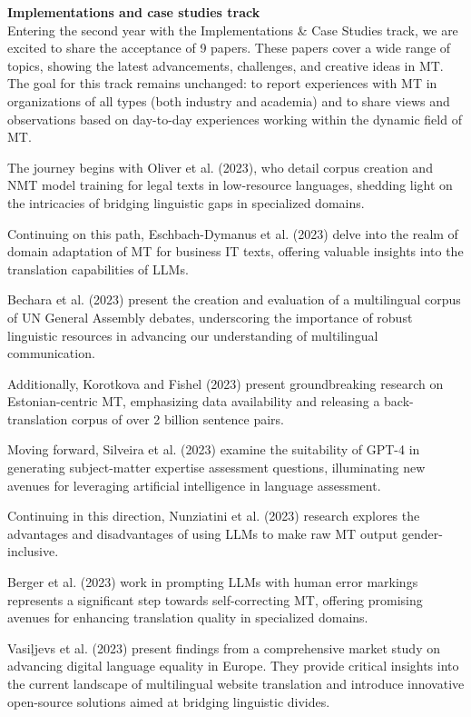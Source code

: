 {\bf Implementations and case studies track} \\
Entering the second year with the Implementations \& Case Studies track, we are excited to share the acceptance of 9 papers. These papers cover a wide range of topics, showing the latest advancements, challenges, and creative ideas in MT. The goal for this track remains unchanged: to report experiences with MT in organizations of all types (both industry and academia) and to share views and observations based on day-to-day experiences working within the dynamic field of MT.

The journey begins with Oliver et al. (2023), who detail corpus creation and NMT model training for legal texts in low-resource languages, shedding light on the intricacies of bridging linguistic gaps in specialized domains.

Continuing on this path, Eschbach-Dymanus et al. (2023) delve into the realm of domain adaptation of MT for business IT texts, offering valuable insights into the translation capabilities of LLMs.

Bechara et al. (2023) present the creation and evaluation of a multilingual corpus of UN General Assembly debates, underscoring the importance of robust linguistic resources in advancing our understanding of multilingual communication.

Additionally, Korotkova and Fishel (2023) present groundbreaking research on Estonian-centric MT, emphasizing data availability and releasing a back-translation corpus of over 2 billion sentence pairs.

Moving forward, Silveira et al. (2023) examine the suitability of GPT-4 in generating subject-matter expertise assessment questions, illuminating new avenues for leveraging artificial intelligence in language assessment.

Continuing in this direction, Nunziatini et al. (2023) research explores the advantages and disadvantages of using LLMs to make raw MT output gender-inclusive.

Berger et al. (2023) work in prompting LLMs with human error markings represents a significant step towards self-correcting MT, offering promising avenues for enhancing translation quality in specialized domains.

Vasiļjevs et al. (2023) present findings from a comprehensive market study on advancing digital language equality in Europe. They provide critical insights into the current landscape of multilingual website translation and introduce innovative open-source solutions aimed at bridging linguistic divides.

